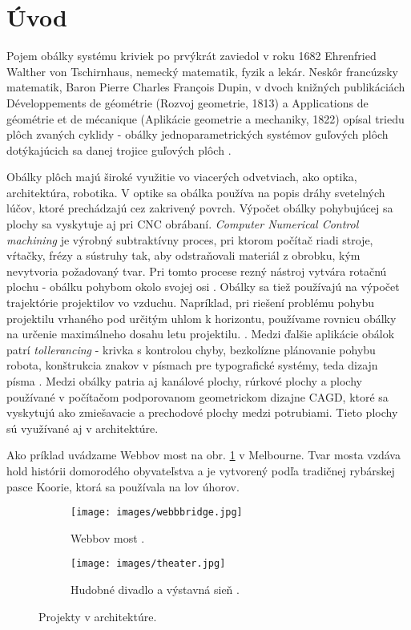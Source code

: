 \chapter*{Úvod} %
Pojem obálky systému kriviek po prvýkrát zaviedol v roku 1682 Ehrenfried Walther von Tschirnhaus, nemecký matematik, fyzik a lekár. Neskôr francúzsky matematik, Baron Pierre Charles François Dupin, v dvoch knižných publikáciách Développements de géométrie (Rozvoj geometrie, 1813) a Applications de géométrie et de mécanique (Aplikácie geometrie a mechaniky, 1822) opísal triedu plôch zvaných cyklidy - obálky jednoparametrických systémov guľových plôch dotýkajúcich sa danej trojice guľových plôch \cite{Ciz2017}.

Obálky plôch majú široké využitie vo viacerých odvetviach, ako optika, architektúra, robotika. V optike sa obálka používa na popis dráhy svetelných lúčov, ktoré prechádzajú cez zakrivený povrch. Výpočet obálky pohybujúcej sa plochy sa vyskytuje aj pri CNC obrábaní. \textit{Computer Numerical Control machining} je výrobný subtraktívny proces, pri ktorom počítač riadi stroje, vŕtačky, frézy a sústruhy tak, aby odstraňovali materiál z obrobku, kým nevytvoria požadovaný tvar. Pri tomto procese rezný nástroj vytvára rotačnú plochu - obálku pohybom okolo svojej osi \cite{Skop20}. Obálky sa tiež používajú na výpočet trajektórie projektilov vo vzduchu. Napríklad, pri riešení problému pohybu projektilu vrhaného pod určitým uhlom k horizontu, používame rovnicu obálky na určenie maximálneho dosahu letu projektilu. \cite{Chud09}. Medzi ďalšie aplikácie obálok patrí \textit{tollerancing} - krivka s kontrolou chyby, bezkolízne plánovanie pohybu robota, konštrukcia znakov v písmach pre typografické systémy, teda dizajn písma \cite{Pott09}. Medzi obálky patria aj kanálové plochy, rúrkové plochy a plochy používané v počítačom podporovanom geometrickom dizajne CAGD, ktoré sa vyskytujú ako zmiešavacie a prechodové plochy medzi potrubiami. Tieto plochy sú využívané aj v architektúre.

Ako príklad uvádzame Webbov most na obr. \ref{fig:webb_bridge} v Melbourne. Tvar mosta vzdáva hold histórii domorodého obyvateľstva a je vytvorený podľa tradičnej rybárskej pasce Koorie, ktorá sa používala na lov úhorov.

\begin{figure}[h]
    \centering
    \begin{subfigure}[b]{0.6\textwidth}
        \centering
        \texttt{[image: images/webbbridge.jpg]}
        \caption[Webbov most.]{Webbov most \cite{WebbBridge}.}
        \label{fig:webb_bridge}
    \end{subfigure}
    \hfill
    \begin{subfigure}[b]{0.6\textwidth}
        \centering
        \texttt{[image: images/theater.jpg]}
        \caption[Hudobné divadlo a výstavná sieň.]{Hudobné divadlo a výstavná sieň \cite{MusicTheater}.}
        \label{fig:theater}
    \end{subfigure}
    \caption{Projekty v architektúre.}
    \label{fig:projects}
\end{figure}

